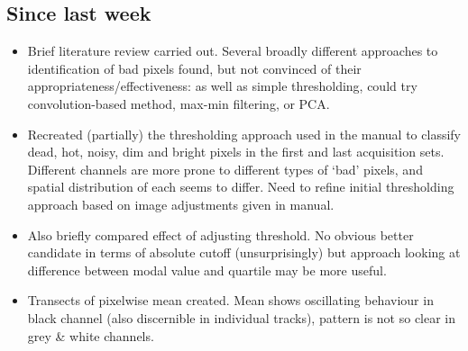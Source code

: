 \documentclass[10pt,fleqn]{article}
\begin{document}
\subsection*{Since last week}

\begin{itemize}

\item Brief literature review carried out. Several broadly different approaches to identification of bad pixels found, but not convinced of their appropriateness/effectiveness: as well as simple thresholding, could try convolution-based method, max-min filtering, or PCA.

\item Recreated (partially) the thresholding approach used in the manual to classify dead, hot, noisy, dim and bright pixels in the first and last acquisition sets. Different channels are more prone to different types of `bad' pixels, and spatial distribution of each seems to differ. Need to refine initial thresholding approach based on image adjustments given in manual.

\item Also briefly compared effect of adjusting threshold. No obvious better candidate in terms of absolute cutoff (unsurprisingly) but approach looking at difference between modal value and quartile may be more useful.

\item Transects of pixelwise mean created. Mean shows oscillating behaviour in black channel (also discernible in individual tracks), pattern is not so clear in grey \& white channels.
\end{itemize}
\end{document}
